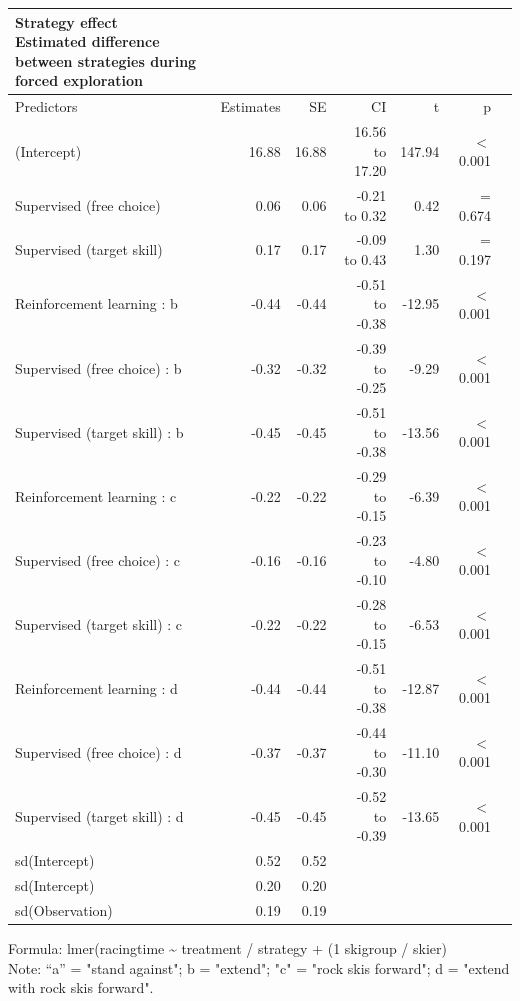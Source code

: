\documentclass[pdflatex,sn-mathphys-num]{sn-jnl}%
\theoremstyle{thmstyleone}%
\theoremstyle{thmstyletwo}%
\theoremstyle{thmstylethree}%
\begin{document}
\begin{appendices}
\setlength{\LTpost}{0mm}
\begin{longtable}{lrrrrrl}
\caption*{
{\large Strategy effect} \\ 
{\small Estimated difference between strategies during forced exploration}
} \\ 
\toprule
Predictors & Estimates & SE & CI & t & p \\ 
\midrule\addlinespace[2.5pt]
(Intercept) & 16.88 & 16.88 & 16.56 to 17.20 & 147.94 &  $<$  0.001 \\ 
Supervised (free choice) & 0.06 & 0.06 & -0.21 to 0.32 & 0.42 &  =  0.674 \\ 
Supervised (target skill) & 0.17 & 0.17 & -0.09 to 0.43 & 1.30 &  =  0.197 \\ 
Reinforcement learning : b & -0.44 & -0.44 & -0.51 to -0.38 & -12.95 &  $<$  0.001 \\ 
Supervised (free choice) : b & -0.32 & -0.32 & -0.39 to -0.25 & -9.29 &  $<$  0.001 \\ 
Supervised (target skill) : b & -0.45 & -0.45 & -0.51 to -0.38 & -13.56 &  $<$  0.001 \\ 
Reinforcement learning : c & -0.22 & -0.22 & -0.29 to -0.15 & -6.39 &  $<$  0.001 \\ 
Supervised (free choice) : c & -0.16 & -0.16 & -0.23 to -0.10 & -4.80 &  $<$  0.001 \\ 
Supervised (target skill) : c & -0.22 & -0.22 & -0.28 to -0.15 & -6.53 &  $<$  0.001 \\ 
Reinforcement learning : d & -0.44 & -0.44 & -0.51 to -0.38 & -12.87 &  $<$  0.001 \\ 
Supervised (free choice) : d & -0.37 & -0.37 & -0.44 to -0.30 & -11.10 &  $<$  0.001 \\ 
Supervised (target skill) : d & -0.45 & -0.45 & -0.52 to -0.39 & -13.65 &  $<$  0.001 \\ 
sd(Intercept) & 0.52 & 0.52 &  &  &   \\ 
sd(Intercept) & 0.20 & 0.20 &  &  &  \\ 
sd(Observation) & 0.19 & 0.19 &  &  &   \\ 
\bottomrule
\end{longtable}
\begin{minipage}{\linewidth}
Formula: lmer(racingtime \textasciitilde{} treatment / strategy + (1 \textbar{} skigroup / skier)\\
Note: “a” = "stand against"; b = "extend"; "c" = "rock skis forward"; d = "extend with rock skis forward".\\
\end{minipage}
\clearpage




\end{appendices}
\end{document}
